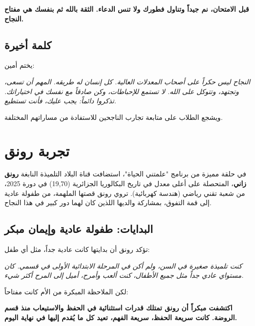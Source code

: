 \documentclass[12pt,a4paper]{book}
\newcommand{\quoteAr}[1]{%
	\begin{myquote}
		\itshape #1
	\end{myquote}
}
\newcommand{\importantAr}[1]{%
	\begin{important}
		\bfseries #1
	\end{important}
}
\begin{document}
	\importantAr{قبل الامتحان، نم جيداً وتناول فطورك ولا تنس الدعاء. الثقة بالله ثم بنفسك هي مفتاح النجاح.}
	
	
	\subsection{كلمة أخيرة}
	
	يختم أمين:
	
	\quoteAr{النجاح ليس حكراً على أصحاب المعدلات العالية. كل إنسان له طريقه. المهم أن تسعى، وتجتهد، وتتوكل على الله. لا تستمع للإحباطات، وكن صادقاً مع نفسك في اختياراتك. تذكروا دائماً: يجب عليك، فأنت تستطيع.}
	
	ويشجع الطلاب على متابعة تجارب الناجحين للاستفادة من مساراتهم المختلفة.
	
	
	
	
	\section{ تجربة رونق}
	
	في حلقة مميزة من برنامج "علمتني الحياة"، استضافت قناة البلاد التلميذة النابغة \textbf{رونق زاني}، المتحصلة على أعلى معدل في تاريخ البكالوريا الجزائرية (19,70) في دورة 2025، من شعبة تقني رياضي (هندسة كهربائية). تروي رونق قصتها الملهمة، من طفولة عادية إلى قمة التفوق، بمشاركة والديها اللذين كان لهما دور كبير في هذا النجاح.
	
	\subsection{البدايات: طفولة عادية وإيمان مبكر}
	تؤكد رونق أن بدايتها كانت عادية جداً، مثل أي طفل:
	\quoteAr{كنت تلميذة صغيرة في السن، ولم أكن في المرحلة الابتدائية الأولى في قسمي. كان مستواي عادي جداً مثل جميع الأطفال، كنت ألعب وأمرح، أميل إلى المرح أكثر شيء.}
	لكن الملاحظة المبكرة من الأم كانت مفتاحاً:
	\importantAr{ اكتشفت مبكراً أن رونق تمتلك قدرات استثنائية في الحفظ و\newline الاستيعاب منذ قسم الروضة. كانت سريعة الحفظ، سريعة الفهم، تعيد كل ما يُقدم إليها في نهاية اليوم.}
	
\end{document}
